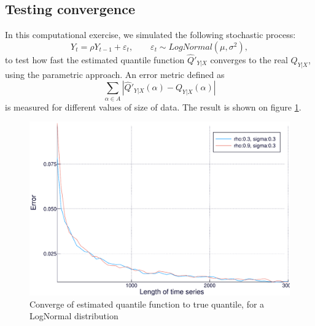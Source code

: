\subsection{Testing convergence}

In this computational exercise, we simulated the following stochastic process:
\begin{equation}
Y_t = \rho Y_{t-1}+ \varepsilon_t,\qquad \varepsilon_t \sim LogNormal(\mu,\sigma^2),
\end{equation}
to test how fast the estimated quantile function $\hat{Q}'_{Y|X}$ converges to the real $Q_{Y|X}$, using the parametric approach. An error metric defined as 
\begin{equation}
\sum_{\alpha \in A} | \hat{Q}'_{Y|X}(\alpha) - Q_{Y|X}(\alpha) |
\end{equation}
is measured for different values of size of data.
The result is shown on figure \ref{fig:convergence}.


\begin{figure}
			\centering     \includegraphics[width=0.6 \textwidth]{Figuras/convergencia-dist/Convergence}
	\caption{Converge of estimated quantile function to true quantile, for a LogNormal distribution}
	\label{fig:convergence}
\end{figure}